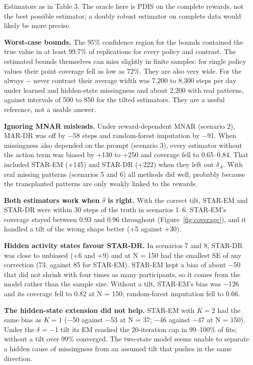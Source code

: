 \documentclass[12pt]{article}
\begin{document}
Estimators as in Table 3. The oracle here is PDIS on the complete rewards, not the best possible estimator; a doubly robust estimator on complete data would likely be more precise.

\textbf{Worst-case bounds.} The 95\% confidence region for the bounds contained the true value in at least 99.7\% of replications for every policy and contrast. The estimated bounds themselves can miss slightly in finite samples: for single policy values their point coverage fell as low as 72\%. They are also very wide. For the always $-$ never contrast their average width was 7,200 to 8,300 steps per day under learned and hidden-state missingness and about 2,200 with real patterns, against intervals of 500 to 850 for the tilted estimators. They are a useful reference, not a usable answer.

\textbf{Ignoring MNAR misleads.} Under reward-dependent MNAR (scenario 2), MAR-DR was off by $-$58 steps and random-forest imputation by $-$91. When missingness also depended on the prompt (scenario 3), every estimator without the action term was biased by +130 to +250 and coverage fell to 0.65--0.84. That included STAR-EM (+145) and STAR-DR (+222) when they left out $\delta_A$. With real missing patterns (scenarios 5 and 6) all methods did well, probably because the transplanted patterns are only weakly linked to the rewards.

\textbf{Both estimators work when $\delta$ is right.} With the correct tilt, STAR-EM and STAR-DR were within 30 steps of the truth in scenarios 1--6. STAR-EM's coverage stayed between 0.93 and 0.96 throughout (Figure~\ref{fig:coverage}), and it handled a tilt of the wrong shape better (+5 against +30).

\textbf{Hidden activity states favour STAR-DR.} In scenarios 7 and 8, STAR-DR was close to unbiased (+6 and +9) and at N = 150 had the smallest SE of any correction (73, against 85 for STAR-EM). STAR-EM kept a bias of about $-$50 that did not shrink with four times as many participants, so it comes from the model rather than the sample size. Without a tilt, STAR-EM's bias was $-$126 and its coverage fell to 0.82 at N = 150; random-forest imputation fell to 0.66.

\textbf{The hidden-state extension did not help.} STAR-EM with $K=2$ had the same bias as $K=1$ ($-$50 against $-$53 at N = 37; $-$46 against $-$47 at N = 150). Under the $\delta$ = $-$1 tilt its EM reached the 20-iteration cap in 99--100\% of fits; without a tilt over 99\% converged. The two-state model seems unable to separate a hidden cause of missingness from an assumed tilt that pushes in the same direction.
\end{document}
